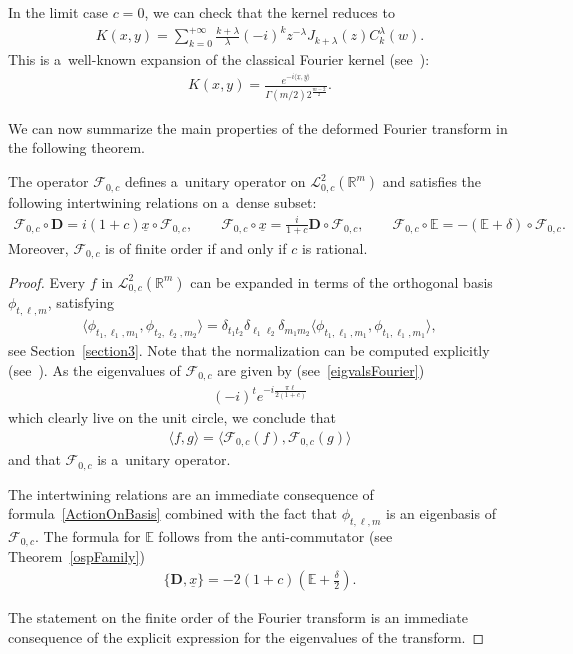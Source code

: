 \documentclass[pdftex]{sigma}
\numberwithin{equation}{section}
\numberwithin{theorem}{section}
\numberwithin{proposition}{section}
\numberwithin{lemma}{section}
\numberwithin{corollary}{section}
\numberwithin{definition}{section}
\numberwithin{example}{section}
\numberwithin{remark}{section}
\numberwithin{note}{section}
\theoremstyle{remark}
\newcommand{\mR}{\mathbb{R}}
\newcommand{\mE}{\mathbb{E}}
\newcommand{\cF}{\mathcal{F}}
\newcommand{\cL}{\mathcal{L}}
\newcommand{\dD}{\textbf{D}}
\newcommand{\ux}{\underline{x}}
\newcommand{\uy}{\underline{y}}
\def\l{{\lambda}}
\def\la{{\langle}}
\def\ra{{\rangle}}
\begin{document}
\begin{remark}
In the limit case $c=0$, we can check that the kernel reduces to
\begin{gather*}
K(x,y)=\sum_{k=0}^{+\infty}\frac{k+\l}{\l}(-i)^{k}z^{-\l}J_{k+\l}(z)C_{k}^{\l}(w).
\end{gather*}
This is a~well-known expansion of the classical Fourier kernel (see~\cite[Section
11.5]{MR0010746}):
\begin{gather*}
K(x,y)=\frac{e^{-i\la\ux,\uy\ra}}{\Gamma(m/2)2^{\frac{m-2}{2}}}.
\end{gather*}
\end{remark}

We can now summarize the main properties of the deformed Fourier transform in the following theorem.

\begin{theorem}\label{StatementsFourier}
The operator $\cF_{0,c}$ defines a~unitary operator on $\cL^{2}_{0,c}(\mR^{m})$ and satisfies the
following intertwining relations on a~dense subset:
\begin{gather*}
\cF_{0, c} \circ \dD = i (1+c) \ux \circ \cF_{0, c},\qquad
\cF_{0, c} \circ \ux = \frac{i}{1+c}\dD \circ \cF_{0, c},\qquad
\cF_{0, c} \circ \mE = - \left( \mE + \delta \right) \circ \cF_{0, c}.
\end{gather*}
Moreover, $\cF_{0,c}$ is of finite order if and only if $c$ is rational.
\end{theorem}

\begin{proof}
Every $f$ in $\cL^{2}_{0,c}(\mR^{m})$ can be expanded in terms of the orthogonal basis
$\phi_{t,\ell,m}$, satisfying
\begin{gather*}
\langle\phi_{t_{1},\ell_{1},m_{1}},\phi_{t_{2},\ell_{2},m_{2}}\rangle=\delta_{t_{1}t_{2}}
\delta_{\ell_{1}\ell_{2}}\delta_{m_{1}m_{2}}\langle\phi_{t_{1},\ell_{1},m_{1}},
\phi_{t_{1},\ell_{1},m_{1}}\rangle,
\end{gather*}
see Section~\ref{section3}.
Note that the normalization can be computed explicitly (see~\cite[Theorem~6]{H12}).
As the eigenvalues of $\cF_{0,c}$ are given by (see~\eqref{eigvalsFourier})
\begin{gather*}
(-i)^{t}e^{-i\frac{\pi\ell}{2(1+c)}}
\end{gather*}
which clearly live on the unit circle, we conclude that
\begin{gather*}
\langle f,g\rangle=\langle\cF_{0,c}(f),\cF_{0,c}(g)\rangle
\end{gather*}
and that $\cF_{0,c}$ is a~unitary operator.

The intertwining relations are an immediate consequence of formula~\eqref{ActionOnBasis} combined
with the fact that $\phi_{t,\ell,m}$ is an eigenbasis of $\cF_{0,c}$.
The formula for $\mE$ follows from the anti-commutator (see Theorem~\ref{ospFamily})
\begin{gather*}
\{\dD,\ux\}=-2(1+c)\left(\mE+\frac{\delta}{2}\right).
\end{gather*}

The statement on the f\/inite order of the Fourier transform is an immediate consequence of the
explicit expression for the eigenvalues of the transform.
\end{proof}
\end{document}

